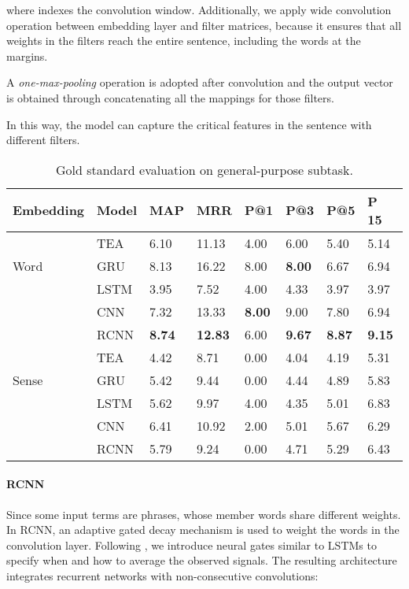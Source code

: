 \documentclass[11pt,a4paper]{article}
\begin{document}
	where  indexes the convolution window. Additionally, we apply wide convolution operation between embedding layer and filter matrices, because it ensures that all weights in the filters reach the entire sentence, including the words at the margins.
	
	A \emph{one-max-pooling} operation is adopted after convolution and the output vector  is obtained through concatenating all the mappings for those  filters.
	
	In this way, the model can capture the critical features in the sentence with different filters.
	
	\begin{table*}[t]\centering \small
		{
			\begin{tabular}{l|l|l|l|l|l|l|l}
				\hline
				\hline
				Embedding &	Model & MAP  &  MRR  & P@1 & P@3 & P@5 & P 15 \\
				\hline
				\multirow{3}{*}{Word}  
				& TEA  &  6.10 &  11.13 &  4.00 &  6.00 &  5.40 &  5.14  \\
				& GRU  &  8.13 &  16.22 &  8.00 &  \textbf{8.00} &  6.67 &  6.94  \\
				& LSTM &  3.95 &  7.52 &  4.00 &  4.33 &  3.97 &  3.97  \\
				& CNN  &  7.32 &  13.33 &  \textbf{8.00} &  9.00 &  7.80 &  6.94  \\
				& RCNN &  \textbf{8.74} &  \textbf{12.83} &  6.00 &  \textbf{9.67} &  \textbf{8.87} &  \textbf{9.15}  \\
				\hline
				\multirow{3}{*}{Sense} 
				& TEA &  4.42 &  8.71 &  0.00 &  4.04 &  4.19 &  5.31  \\
				& GRU  &  5.42 &  9.44 &  0.00 &  4.44 &  4.89 &  5.83  \\
				& LSTM &  5.62 &  9.97 &  4.00 &  4.35 &  5.01 &  6.83  \\
				& CNN  &  6.41 &  10.92 &  2.00 &  5.01 &  5.67 &  6.29  \\
				& RCNN &  5.79 &  9.24 &  0.00 &  4.71 &  5.29 &  6.43  \\
				\hline
				\hline
			\end{tabular}
			
		}
		\caption{\label{tab:result_sense_word} Gold standard
			evaluation on general-purpose subtask.}
	\end{table*}
	
\paragraph{RCNN}
Since some input terms are phrases, whose member words share different weights. In RCNN, an adaptive gated decay mechanism is used to weight the words in the convolution layer. Following \cite{Lei:2016}, we introduce neural gates similar  to LSTMs
to specify when and how to average the observed signals. The resulting architecture integrates recurrent  networks with  non-consecutive  convolutions:
\end{document}
